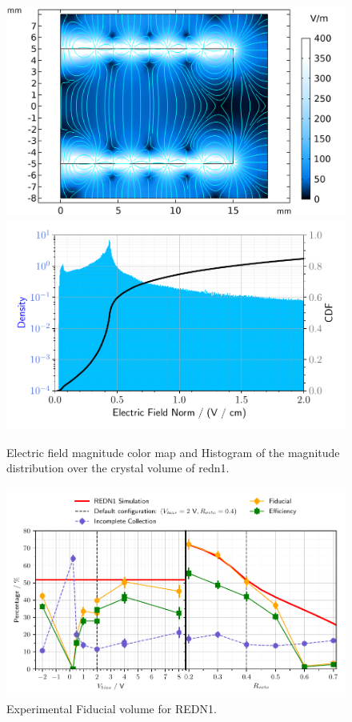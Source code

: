 \begin{figure}
\centering
\includegraphics[align=c, scale=0.5]{Figures/ElectrodesExperimental/efield_redn1.png}
\includegraphics[align=c, scale=0.5]{Figures/ElectrodesExperimental/enorm_hist_redn1.pdf}
\caption{Electric field magnitude color map and Histogram of the magnitude distribution over the crystal volume of redn1.}
\label{fig:efield-redn1}
\end{figure}

\begin{figure}
\centering
\includegraphics[scale=1]{Figures/ElectrodesExperimental/redn1_experimental_fiducial_volume.pdf}
\caption{Experimental Fiducial volume for REDN1.}
\label{fig:redn1-experimental-fiducial-volume}
\end{figure}



